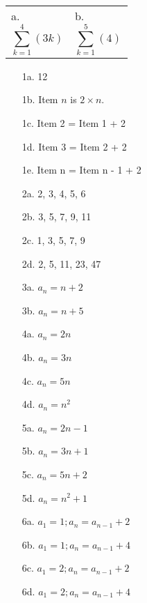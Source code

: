 {\begin{questionNOGRADE}{\thequestion}
        \begin{center}
            \begin{tabular}{p{6cm} p{6cm}}
            a. $$ \sum_{k=1}^{4}(3k) $$
            &
            b. $$ \sum_{k=1}^{5}(4) $$
        \end{tabular} 
        \end{center}     
    \end{questionNOGRADE}

    
}{
    \begin{enumerate}
        \item[1a.]   12
        \item[1b.]  Item $n$ is $2 \times n$.
        \item[1c.]  Item 2 = Item 1 + 2
        \item[1d.]  Item 3 = Item 2 + 2
        \item[1e.]  Item n = Item n - 1 + 2

        \item[2a.]  2, 3, 4, 5, 6
        \item[2b.]  3, 5, 7, 9, 11
        \item[2c.]  1, 3, 5, 7, 9
        \item[2d.]  2, 5, 11, 23, 47

        \item[3a.]  $a_{n} = n+2$
        \item[3b.]  $a_{n} = n+5$
        
        \item[4a.]  $a_{n} = 2n$
        \item[4b.]  $a_{n} = 3n$
        \item[4c.]  $a_{n} = 5n$
        \item[4d.]  $a_{n} = n^{2}$

        \item[5a.]  $a_{n} = 2n-1$
        \item[5b.]  $a_{n} = 3n+1$
        \item[5c.]  $a_{n} = 5n+2$
        \item[5d.]  $a_{n} = n^{2} + 1$

        \item[6a.]  $a_{1} = 1; a_{n} = a_{n-1} + 2$
        \item[6b.]  $a_{1} = 1; a_{n} = a_{n-1} + 4$
        \item[6c.]  $a_{1} = 2; a_{n} = a_{n-1} + 2$
        \item[6d.]  $a_{1} = 2; a_{n} = a_{n-1} + 4$


\end{enumerate}}
